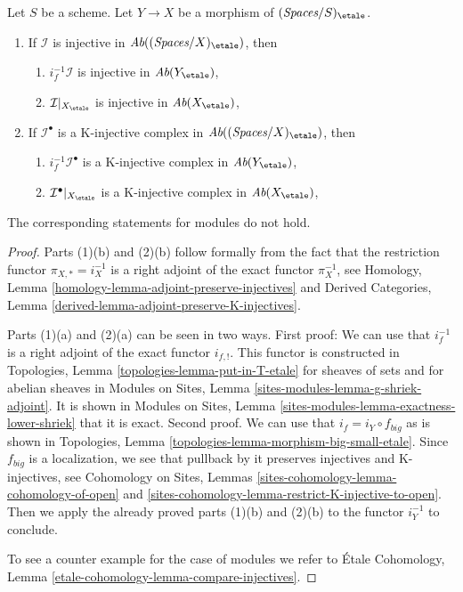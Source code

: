 \begin{lemma}
\label{lemma-compare-injectives}
Let $S$ be a scheme.
Let $Y \to X$ be a morphism of $(\textit{Spaces}/S)_\etale$.
\begin{enumerate}
\item If $\mathcal{I}$ is injective in
$\textit{Ab}((\textit{Spaces}/X)_\etale)$, then
\begin{enumerate}
\item $i_f^{-1}\mathcal{I}$ is injective in $\textit{Ab}(Y_\etale)$,
\item $\mathcal{I}|_{X_\etale}$ is injective in $\textit{Ab}(X_\etale)$,
\end{enumerate}
\item If $\mathcal{I}^\bullet$ is a K-injective complex
in $\textit{Ab}((\textit{Spaces}/X)_\etale)$, then
\begin{enumerate}
\item $i_f^{-1}\mathcal{I}^\bullet$ is a K-injective complex in
$\textit{Ab}(Y_\etale)$,
\item $\mathcal{I}^\bullet|_{X_\etale}$ is a K-injective complex in
$\textit{Ab}(X_\etale)$,
\end{enumerate}
\end{enumerate}
The corresponding statements for modules do not hold.
\end{lemma}

\begin{proof}
Parts (1)(b) and (2)(b)
follow formally from the fact that the restriction functor
$\pi_{X, *} = i_X^{-1}$ is a right adjoint of the exact functor
$\pi_X^{-1}$, see
Homology, Lemma \ref{homology-lemma-adjoint-preserve-injectives} and
Derived Categories, Lemma \ref{derived-lemma-adjoint-preserve-K-injectives}.

\medskip\noindent
Parts (1)(a) and (2)(a) can be seen in two ways. First proof: We can use
that $i_f^{-1}$ is a right adjoint of the exact functor $i_{f, !}$.
This functor is constructed in
Topologies, Lemma \ref{topologies-lemma-put-in-T-etale}
for sheaves of sets and for abelian sheaves in
Modules on Sites, Lemma \ref{sites-modules-lemma-g-shriek-adjoint}.
It is shown in Modules on Sites, Lemma
\ref{sites-modules-lemma-exactness-lower-shriek} that it is exact.
Second proof. We can use that $i_f = i_Y \circ f_{big}$ as is shown
in Topologies, Lemma \ref{topologies-lemma-morphism-big-small-etale}.
Since $f_{big}$ is a localization, we see that pullback by it
preserves injectives and K-injectives, see
Cohomology on Sites, Lemmas \ref{sites-cohomology-lemma-cohomology-of-open} and
\ref{sites-cohomology-lemma-restrict-K-injective-to-open}.
Then we apply the already proved parts (1)(b) and (2)(b)
to the functor $i_Y^{-1}$ to conclude.

\medskip\noindent
To see a counter example for the case of modules we refer to
\'Etale Cohomology, Lemma \ref{etale-cohomology-lemma-compare-injectives}.
\end{proof}

